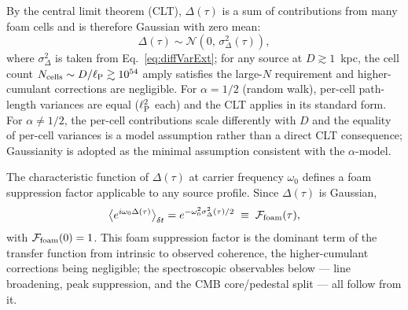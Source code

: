 \documentclass[aps,prd,onecolumn,amsmath,amssymb]{revtex4-2}
\begin{document}
By the central limit theorem (CLT), $\Delta(\tau)$
is a sum of contributions from many foam cells and is therefore Gaussian with zero mean:
\begin{equation}
  \Delta(\tau)
  \sim \mathcal{N}\!\left(0,\,\sigma_\Delta^2(\tau)\right),
  \label{eq:kernel}
\end{equation}
where $\sigma_\Delta^2$ is taken from Eq.~\eqref{eq:diffVarExt}; for
any source at $D \gtrsim 1$~kpc, the cell count
$N_{\rm cells} \sim D/\ell_{\rm P} \gtrsim 10^{54}$ amply satisfies
the large-$N$ requirement and higher-cumulant corrections are negligible.  For $\alpha = 1/2$ (random walk), per-cell path-length variances
are equal ($\ell_{\rm P}^2$ each) and the CLT applies in its standard form.
For $\alpha \neq 1/2$, the per-cell contributions scale differently with $D$
and the equality of per-cell variances is a model assumption rather than a
direct CLT consequence; Gaussianity is adopted as the minimal assumption
consistent with the $\alpha$-model.

The characteristic function of $\Delta(\tau)$ at carrier frequency
$\omega_0$ defines a foam suppression factor applicable to any source
profile.  Since $\Delta(\tau)$ is Gaussian,
\begin{equation}
  \big\langle e^{i\omega_0\Delta(\tau)}\big\rangle_{\delta t}
  = e^{-\omega_0^2\sigma_\Delta^2(\tau)/2}
  \;\equiv\; \mathcal{F}_{\rm foam}(\tau),
  \label{eq:gaussian_jitter}
\end{equation}
with $\mathcal{F}_{\rm foam}(0) = 1$.
This foam suppression factor is the dominant term of the transfer
function from intrinsic to observed coherence, the higher-cumulant
corrections being negligible; the spectroscopic observables below ---
line broadening, peak suppression, and the CMB core/pedestal split ---
all follow from it.
\end{document}
